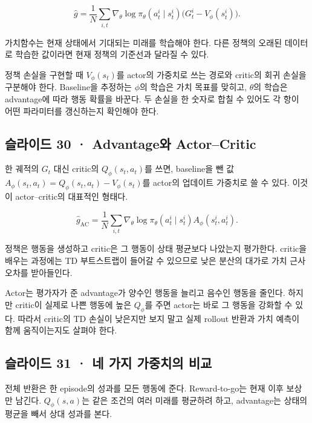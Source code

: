 \documentclass[11pt,a4paper]{article}
\begin{document}
\[
\widehat g
=\frac1N\sum_{i,t}
\nabla_\theta\log\pi_\theta(a_t^i\mid s_t^i)
\bigl(G_t^i-V_\phi(s_t^i)\bigr).
\]

가치함수는 현재 상태에서 기대되는 미래를 학습해야 한다. 다른 정책의 오래된 데이터로 학습한 값이라면 현재 정책의 기준선과 달라질 수 있다.\par

정책 손실을 구현할 때 $V_\phi(s_t)$를 actor의 가중치로 쓰는 경로와 critic의 회귀 손실을 구분해야 한다. Baseline을 추정하는 $\phi$의 학습은 가치 목표를 맞히고, $\theta$의 학습은 advantage에 따라 행동 확률을 바꾼다. 두 손실을 한 숫자로 합칠 수 있어도 각 항이 어떤 파라미터를 갱신하는지 확인해야 한다.\par

\subsection{슬라이드 30 · Advantage와 Actor–Critic}

한 궤적의 $G_t$ 대신 critic의 $Q_\phi(s_t,a_t)$를 쓰면, baseline을 뺀 값 $A_\phi(s_t,a_t)=Q_\phi(s_t,a_t)-V_\phi(s_t)$를 actor의 업데이트 가중치로 쓸 수 있다. 이것이 actor–critic의 대표적인 형태다.\par

\[
\widehat g_{\mathrm{AC}}
=\frac1N\sum_{i,t}
\nabla_\theta\log\pi_\theta(a_t^i\mid s_t^i)
A_\phi(s_t^i,a_t^i).
\]

정책은 행동을 생성하고 critic은 그 행동이 상태 평균보다 나았는지 평가한다. critic을 배우는 과정에는 TD 부트스트랩이 들어갈 수 있으므로 낮은 분산의 대가로 가치 근사 오차를 받아들인다.\par

Actor는 평가자가 준 advantage가 양수인 행동을 늘리고 음수인 행동을 줄인다. 하지만 critic이 실제로 나쁜 행동에 높은 $Q_\phi$를 주면 actor는 바로 그 행동을 강화할 수 있다. 따라서 critic의 TD 손실이 낮은지만 보지 말고 실제 rollout 반환과 가치 예측이 함께 움직이는지도 살펴야 한다.\par

\subsection{슬라이드 31 · 네 가지 가중치의 비교}

전체 반환은 한 episode의 성과를 모든 행동에 준다. Reward-to-go는 현재 이후 보상만 남긴다. $Q_\phi(s,a)$는 같은 조건의 여러 미래를 평균하려 하고, advantage는 상태의 평균을 빼서 상대 성과를 본다.\par
\end{document}
